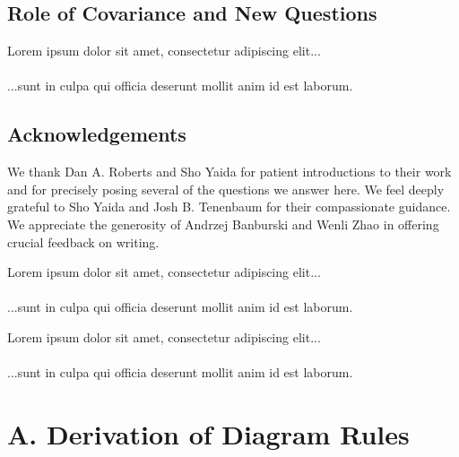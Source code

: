 \documentclass{article}
\newcommand{\lorem}[1]{
    Lorem ipsum dolor sit amet, consectetur adipiscing elit...\\
    \nopagebreak\vspace{#1cm} \ \\
    ...sunt in culpa qui officia deserunt mollit anim id est laborum.
}
\begin{document}
\subsection{Role of Covariance and New Questions}
    \lorem{3}


\subsection{Acknowledgements}
    We thank Dan A. Roberts and Sho Yaida for patient introductions to their
    work and for precisely posing several of the questions we answer here.  We
    feel deeply grateful to Sho Yaida and Josh B. Tenenbaum for their
    compassionate guidance.  We appreciate the generosity of
        Andrzej Banburski
        and
        Wenli Zhao
    in offering crucial feedback on writing.


    
    

    \lorem{3}
    \lorem{3}


\section*{A. Derivation of Diagram Rules}
\end{document}
